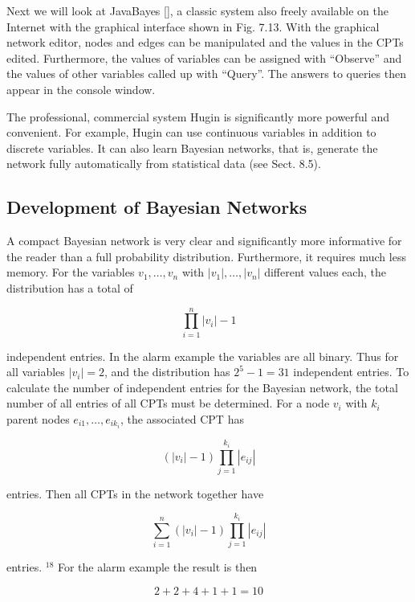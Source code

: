 \documentclass[10pt]{book}
\begin{document}
Next we will look at JavaBayes [\cite{cozman1998javabayes}], a classic system also freely available on the Internet with the graphical interface shown in Fig. 7.13. With the graphical network editor, nodes and edges can be manipulated and the values in the CPTs edited. Furthermore, the values of variables can be assigned with ``Observe'' and the values of other variables called up with ``Query''. The answers to queries then appear in the console window.

The professional, commercial system Hugin is significantly more powerful and convenient. For example, Hugin can use continuous variables in addition to discrete variables. It can also learn Bayesian networks, that is, generate the network fully automatically from statistical data (see Sect. 8.5).

\subsection{Development of Bayesian Networks}
A compact Bayesian network is very clear and significantly more informative for the reader than a full probability distribution. Furthermore, it requires much less memory. For the variables $v_{1}, \ldots, v_{n}$ with $\left|v_{1}\right|, \ldots,\left|v_{n}\right|$ different values each, the distribution has a total of

$$
\prod_{i=1}^{n}\left|v_{i}\right|-1
$$

independent entries. In the alarm example the variables are all binary. Thus for all variables $\left|v_{i}\right|=2$, and the distribution has $2^{5}-1=31$ independent entries. To calculate the number of independent entries for the Bayesian network, the total number of all entries of all CPTs must be determined. For a node $v_{i}$ with $k_{i}$ parent nodes $e_{i 1}, \ldots, e_{i k_{i}}$, the associated CPT has

$$
\left(\left|v_{i}\right|-1\right) \prod_{j=1}^{k_{i}}\left|e_{i j}\right|
$$

entries. Then all CPTs in the network together have

\begin{equation*}
\sum_{i=1}^{n}\left(\left|v_{i}\right|-1\right) \prod_{j=1}^{k_{i}}\left|e_{i j}\right| \tag{7.24}
\end{equation*}

entries. ${ }^{18}$ For the alarm example the result is then

$$
2+2+4+1+1=10
$$
\end{document}
